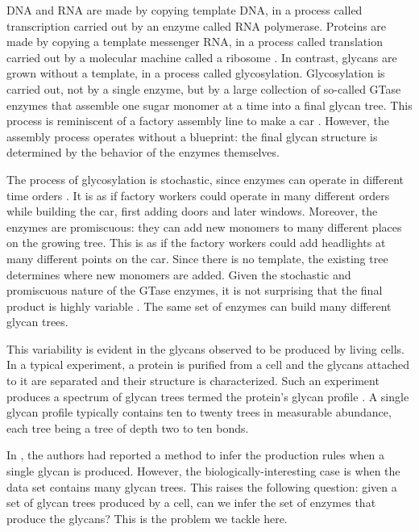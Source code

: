 
DNA and RNA are made by copying template DNA, in a process called transcription carried out by an enzyme called RNA polymerase. Proteins are made by copying a template messenger RNA, in a process called translation carried out by a molecular machine called a ribosome \cite{alberts2013essential}. In contrast, glycans are grown without a template, in a process called glycosylation. Glycosylation is carried out, not by a single enzyme, but by a large collection of so-called GTase enzymes that assemble one sugar monomer at a time into a final glycan tree. This process is reminiscent of a factory assembly line to make a car \cite{Jaiman2018}. However, the assembly process operates without a blueprint: the final glycan structure is determined by the behavior of the enzymes themselves.

The process of glycosylation is stochastic, since enzymes can operate in different time orders \cite{Spahn2016}. It is as if factory workers could operate in many different orders while building the car, first adding doors and later windows. Moreover, the enzymes are promiscuous: they can add new monomers to many different places on the growing tree. This is as if the factory workers could add headlights at many different points on the car. Since there is no template, the existing tree determines where new monomers are added. Given the stochastic and promiscuous nature of the GTase enzymes, it is not surprising that the final product is highly variable \cite{Spahn2014}. The same set of enzymes can build many different glycan trees.

This variability is evident in the glycans observed to be produced by living cells. In a typical experiment, a protein is purified from a cell and the glycans attached to it are separated and their structure is characterized. Such an experiment produces a spectrum of glycan trees termed the protein's glycan profile \cite{Spahn2014}. A single glycan profile typically contains ten to twenty trees in measurable abundance, each tree being a tree of depth two to ten bonds. 

In \cite{Jaiman440792}, the authors had reported a method to infer the production rules when a single glycan is produced. However, the biologically-interesting case is when the data set contains many glycan trees. This raises the following question: given a set of glycan trees produced by a cell,
can we infer the set of enzymes that produce the glycans? This is the problem we tackle here.

